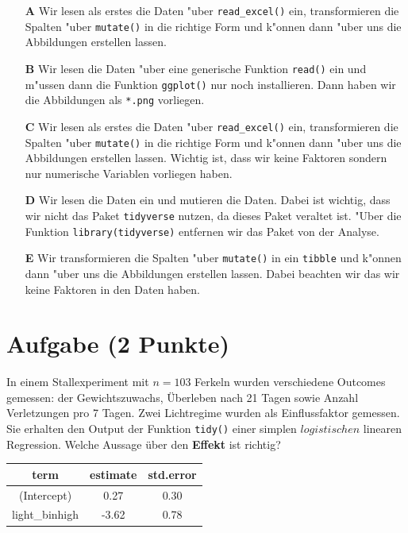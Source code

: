 \documentclass[a4paper, 10pt]{scrartcl}\usepackage[]{graphicx}\usepackage[]{xcolor}
\begin{document}
\begin{enumerate}
\item [\textbf{A} \msquare] Wir lesen als erstes die Daten {"u}ber \texttt{read\_excel()} ein, transformieren die Spalten {"u}ber \texttt{mutate()} in die richtige Form und k{"o}nnen dann {"u}ber  uns die Abbildungen erstellen lassen.
\item [\textbf{B} \msquare] Wir lesen die Daten {"u}ber eine generische Funktion \texttt{read()} ein und m{"u}ssen dann die Funktion \texttt{ggplot()} nur noch installieren. Dann haben wir die Abbildungen als \texttt{*.png} vorliegen.
\item [\textbf{C} \msquare] Wir lesen als erstes die Daten {"u}ber \texttt{read\_excel()} ein, transformieren die Spalten {"u}ber \texttt{mutate()} in die richtige Form und k{"o}nnen dann  {"u}ber  uns die Abbildungen erstellen lassen. Wichtig ist, dass wir keine Faktoren sondern nur numerische Variablen vorliegen haben.
\item [\textbf{D} \msquare] Wir lesen die Daten ein und mutieren die Daten. Dabei ist wichtig, dass wir nicht das Paket \texttt{tidyverse} nutzen, da dieses Paket veraltet ist. {"U}ber die Funktion \texttt{library(tidyverse)} entfernen wir das Paket von der Analyse.
\item [\textbf{E} \msquare] Wir transformieren die Spalten {"u}ber \texttt{mutate()} in ein \texttt{tibble} und k{"o}nnen dann {"u}ber  uns die Abbildungen erstellen lassen. Dabei beachten wir das wir keine Faktoren in den Daten haben.
\end{enumerate}

\section{Aufgabe \hfill (2 Punkte)}



In einem Stallexperiment mit $n = 103$ Ferkeln wurden verschiedene
Outcomes gemessen: der Gewichtszuwachs, {\"U}berleben nach 21 Tagen sowie
Anzahl Verletzungen pro 7 Tagen. Zwei Lichtregime wurden als
Einflussfaktor gemessen. Sie erhalten den \Rlogo Output der Funktion
\texttt{tidy()} einer simplen $logistischen$ linearen
Regression. Welche Aussage {\"u}ber den \textbf{Effekt} ist richtig?

\begin{table}[!h]
\centering
\begin{tabular}{ccc}
\toprule
term & estimate & std.error\\
\midrule
(Intercept) & 0.27 & 0.30\\
light\_binhigh & -3.62 & 0.78\\
\bottomrule
\end{tabular}
\end{table}
\end{document}
